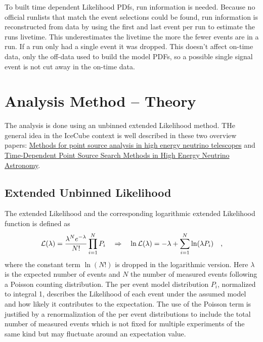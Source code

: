 To built time dependent Likelihood PDfs, run information is needed.
Because no official runlists that match the event selections could be found, run information is reconstructed from data by using the first and last event per run to estimate the runs livetime.
This underestimates the livetime the more the fewer events are in a run.
If a run only had a single event it was dropped.
This doesn't affect on-time data, only the off-data used to build the model PDFs, so a possible single signal event is not cut away in the on-time data.



\section{Analysis Method – Theory}
The analysis is done using an unbinned extended Likelihood method.
THe general idea in the IceCube context is well described in these two overview papers: \href{https://arxiv.org/abs/0801.1604}{Methods for point source analysis in high energy neutrino telescopes} and \href{https://arxiv.org/abs/0912.1572v1}{Time-Dependent Point Source Search Methods in High Energy Neutrino Astronomy}.

\subsection{Extended Unbinned Likelihood}
The extended Likelihood and the corresponding logarithmic extended Likelihood function is defined as
\begin{equation}
  \mathcal{L}(\lambda) = \frac{\lambda^N e^{-\lambda}}{N!}\prod_{i=1}^N P_i
  \quad\Rightarrow\quad
    \ln\mathcal{L}(\lambda) = -\lambda+\sum_{i=1}^N \ln(\lambda P_i)
  \quad\text{,}
\end{equation}
where the constant term $\ln(N!)$ is dropped in the logarithmic version.
Here $\lambda$ is the expected number of events and $N$ the number of measured events following a Poisson counting distribution.
The per event model distribution $P_i$, normalized to integral 1, describes the Likelihood of each event under the assumed model and how likely it contributes to the expectation.
The use of the Poisson term is justified by a renormalization of the per event distributions to include the total number of measured events which is not fixed for multiple experiments of the same kind but may fluctuate around an expectation value.

